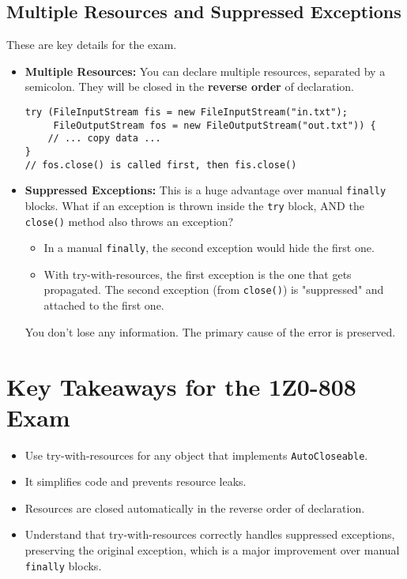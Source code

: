 \documentclass[12pt]{article}
\begin{document}
\begin{enumerate}[label=(\arabic*)]
\subsection{Multiple Resources and Suppressed Exceptions}
These are key details for the exam.
\begin{itemize}
    \item \textbf{Multiple Resources:} You can declare multiple resources, separated by a semicolon. They will be closed in the \textbf{reverse order} of declaration.
\begin{verbatim}
try (FileInputStream fis = new FileInputStream("in.txt");
     FileOutputStream fos = new FileOutputStream("out.txt")) {
    // ... copy data ...
}
// fos.close() is called first, then fis.close()
\end{verbatim}
    \item \textbf{Suppressed Exceptions:} This is a huge advantage over manual \texttt{finally} blocks. What if an exception is thrown inside the \texttt{try} block, AND the \texttt{close()} method also throws an exception?
    \begin{itemize}
        \item In a manual \texttt{finally}, the second exception would hide the first one.
        \item With try-with-resources, the first exception is the one that gets propagated. The second exception (from \texttt{close()}) is "suppressed" and attached to the first one.
    \end{itemize}
    You don't lose any information. The primary cause of the error is preserved.
\end{itemize}

\section*{Key Takeaways for the 1Z0-808 Exam}
\begin{itemize}
    \item Use try-with-resources for any object that implements \texttt{AutoCloseable}.
    \item It simplifies code and prevents resource leaks.
    \item Resources are closed automatically in the reverse order of declaration.
    \item Understand that try-with-resources correctly handles suppressed exceptions, preserving the original exception, which is a major improvement over manual \texttt{finally} blocks.
\end{itemize}
\end{enumerate}
\end{document}
